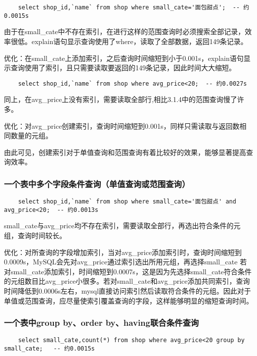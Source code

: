 \documentclass[a4paper, 11pt, nofonts, nocap, fancyhdr]{ctexart}
\begin{document}
	\begin{lstlisting}
	select shop_id,`name` from shop where small_cate='面包甜点';  -- 约0.0015s
	\end{lstlisting}

由于在small_cate中不存在索引，在进行这样的范围查询时必须搜索全部记录，效率很低。explain语句显示查询使用了where，读取了全部数据，返回149条记录。

优化：在small_cate上添加索引，之后查询时间缩短到小于0.001s，explain语句显示查询使用了索引，且只需要读取要返回的149条记录，因此时间大大缩短。

	\begin{lstlisting}
	select shop_id,`name` from shop where avg_price<20;  -- 约0.0027s
	\end{lstlisting}

同上，在avg_price上没有索引，需要读取全部行,相比3.1.4中的范围查询慢了许多。

优化：对avg_price创建索引，查询时间缩短到0.001s，同样只需读取与返回数相同数量的元组。

由此可见，创建索引对于单值查询和范围查询有着比较好的效果，能够显著提高查询效率。

\subsubsection{一个表中多个字段条件查询（单值查询或范围查询）}
	
	\begin{lstlisting}
	select shop_id,`name` from shop where small_cate='面包甜点' and avg_price<20;  -- 约0.0013s
	\end{lstlisting}

small_cate与avg_price均不存在索引，需要读取全部行，再选出符合条件的元组，查询时间较长。

优化：对所查询的字段增加索引，当对avg_price添加索引时，查询时间缩短到0.0009s，MySQL会先对avg_price通过索引选出所用元组，再选择small_cate
若对small_cate添加索引，时间缩短到0.0007s，这是因为先选择small_cate符合条件的元组数目比avg_price小很多。若对small_cate和avg_price添加共同索引，查询时间降低到0.0006s左右，mysql直接访问索引然后读取符合条件的元组。因此对于单值或范围查询，应尽量使索引覆盖查询的字段，这样能够明显的缩短查询时间。
	
\subsubsection{一个表中group by、order by、having联合条件查询}

	\begin{lstlisting}
	select small_cate,count(*) from shop where avg_price<20 group by small_cate;   -- 约0.0015s
	\end{lstlisting}
\end{document}
